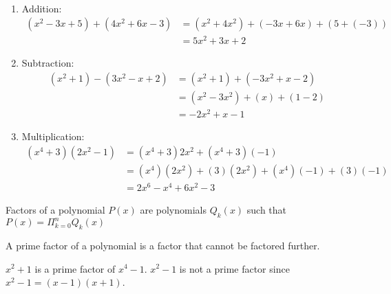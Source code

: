 \documentclass[crop=false,class=book,oneside]{standalone}
\begin{document}
            \begin{example}
                \
                \begin{enumerate}
                    \item Addition:
                        \begin{align*}
                            (x^{2}-3x+5)+(4x^{2}+6x-3)
                            &=(x^{2}+4x^{2})+(-3x+6x)+(5+(-3))\\
                            &=5x^{2}+3x+2
                        \end{align*}
                    \item Subtraction:
                        \begin{align*}
                            (x^{2}+1)-(3x^{2}-x+2)
                            &=(x^{2}+1)+(-3x^{2}+x-2)\\
                            &=(x^{2}-3x^{2})+(x)+(1-2)\\
                            &=-2x^{2}+x-1
                        \end{align*}
                    \item Multiplication:
                        \begin{align*}
                            (x^{4}+3)(2x^{2}-1)
                            &=(x^{4}+3)2x^{2}+(x^{4}+3)(-1)\\
                            &=(x^{4})(2x^{2})+(3)(2x^{2})
                            +(x^{4})(-1)+(3)(-1)\\
                            &=2x^{6}-x^{4}+6x^{2}-3
                        \end{align*}
                \end{enumerate}
            \end{example}
            \begin{definition}
                Factors of a polynomial $P(x)$ are polynomials
                $Q_{k}(x)$ such that $P(x)=\Pi_{k=0}^{n}Q_{k}(x)$
            \end{definition}
            \begin{definition}
                A prime factor of a polynomial is a factor that
                cannot be factored further.
            \end{definition}
            \begin{example}
                $x^{2}+1$ is a prime factor of $x^{4}-1$.
                $x^{2}-1$ is not a prime factor since
                $x^{2}-1=(x-1)(x+1)$.
            \end{example}
\end{document}

